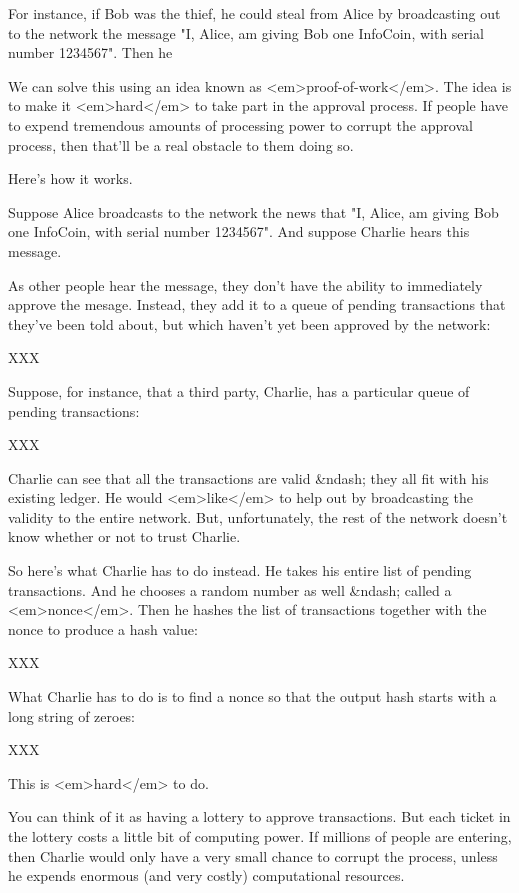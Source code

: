 For instance, if Bob was the thief, he could steal from Alice by
broadcasting out to the network the message "I, Alice, am giving Bob
one InfoCoin, with serial number 1234567".  Then he 

We can solve this using an idea known as <em>proof-of-work</em>.  The
idea is to make it <em>hard</em> to take part in the approval process.
If people have to expend tremendous amounts of processing power to
corrupt the approval process, then that'll be a real obstacle to them
doing so.

Here's how it works.

Suppose Alice broadcasts to the network the news that "I, Alice, am
giving Bob one InfoCoin, with serial number 1234567".  And suppose
Charlie hears this message.

As other people
hear the message, they don't have the ability to immediately approve
the mesage.  Instead, they add it to a queue of pending transactions
that they've been told about, but which haven't yet been approved by
the network:

XXX

Suppose, for instance, that a third party, Charlie, has a particular
queue of pending transactions:

XXX

Charlie can see that all the transactions are valid &ndash; they all fit
with his existing ledger.  He would <em>like</em> to help out by
broadcasting the validity to the entire network.  But, unfortunately,
the rest of the network doesn't know whether or not to trust Charlie.

So here's what Charlie has to do instead.  He takes his entire list of
pending transactions.  And he chooses a random number as well &ndash;
called a <em>nonce</em>.  Then he hashes the list of transactions
together with the nonce to produce a hash value:

XXX

What Charlie has to do is to find a nonce so that the output hash
starts with a long string of zeroes:

XXX

This is <em>hard</em> to do.  


You can think of it as having a lottery to approve transactions.  But
each ticket in the lottery costs a little bit of computing power.  If
millions of people are entering, then Charlie would only have a very
small chance to corrupt the process, unless he expends enormous (and
very costly) computational resources.

